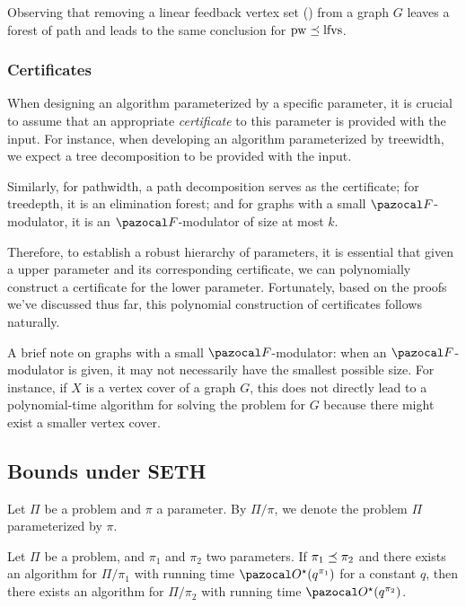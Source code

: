 \medskip

Observing that removing a linear feedback vertex set (\lfvs) from a graph $G$ leaves a forest of path and leads to the same conclusion for $\text{pw} \preceq \text{lfvs}$.

\subsubsection*{Certificates}

When designing an algorithm parameterized by a specific parameter, it is crucial to assume that an appropriate \textit{certificate} to this parameter is provided with the input. For instance, when developing an algorithm parameterized by treewidth, we expect a tree decomposition to be provided with the input.

Similarly, for pathwidth, a path decomposition serves as the certificate; for treedepth, it is an elimination forest; and for graphs with a small $\F$-modulator, it is an $\F$-modulator of size at most $k$.

Therefore, to establish a robust hierarchy of parameters, it is essential that given a upper parameter and its corresponding certificate, we can polynomially construct a certificate for the lower parameter. Fortunately, based on the proofs we've discussed thus far, this polynomial construction of certificates follows naturally.

\medskip

A brief note on graphs with a small $\F$-modulator: when an $\F$-modulator is given, it may not necessarily have the smallest possible size. For instance, if $X$ is a vertex cover of a graph $G$, this does not directly lead to a polynomial-time algorithm for solving the  problem for $G$ because there might exist a smaller vertex cover.

\subsection{Bounds under SETH}

Let $\Pi$ be a problem and $\pi$ a parameter. By $\Pi/\pi$, we denote the problem $\Pi$ parameterized by $\pi$.

\begin{observation}
    \label{obs:upper_bound}
    Let $\Pi$ be a problem, and $\pi_1$ and $\pi_2$ two parameters. If $\pi_1 \preceq \pi_2$ and there exists an algorithm for $\Pi/\pi_1$ with running time $\O^\star(q^{\pi_1})$ for a constant $q$, then there exists an algorithm for $\Pi/\pi_2$ with running time $\O^\star(q^{\pi_2})$.
\end{observation}

